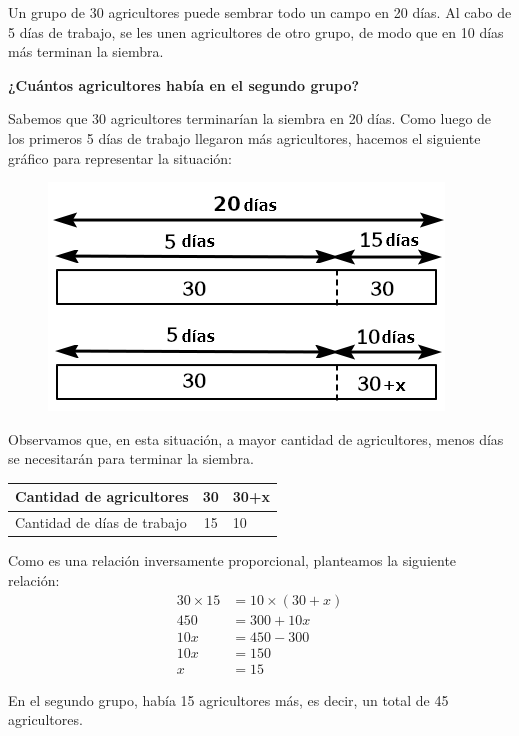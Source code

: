 \question[10] Un grupo de 30 agricultores puede sembrar todo un campo en 20 días. Al cabo de 5 días de trabajo,
se les unen agricultores de otro grupo, de modo que en 10 días
más terminan la siembra.

\textbf{¿Cuántos agricultores había en el segundo grupo?}

\begin{solutionbox}{9cm}
    Sabemos que 30 agricultores terminarían la siembra en 20 días. Como luego de los primeros 5 días de trabajo llegaron más agricultores, hacemos el siguiente gráfico para representar la situación:

    \begin{minipage}{.35\textwidth}
        \begin{figure}[H]
            \centering
            \includegraphics[width=\linewidth]{../images/tableS8L103_agri}
        \end{figure}
    \end{minipage}\hfill
    \begin{minipage}{.55\textwidth}
        Observamos que, en esta situación, a mayor cantidad de agricultores, menos días se necesitarán para terminar la siembra.
        \begin{table}[H]
            \centering
            \begin{tabular}{|l|c|l|}
                \hline
                Cantidad de agricultores    & 30 & 30+x \\
                \hline
                Cantidad de días de trabajo & 15 & 10   \\
                \hline
            \end{tabular}
        \end{table}
        Como es una relación inversamente proporcional, planteamos la siguiente relación:
        \begin{align*}
            30 \times 15 & = 10 \times (30+x) \\
            450          & = 300 +10x         \\
            10x          & = 450-300          \\
            10x          & = 150              \\
            x            & = 15
        \end{align*}
    \end{minipage}

    En el segundo grupo, había 15 agricultores más, es decir, un total de 45 agricultores.
\end{solutionbox}